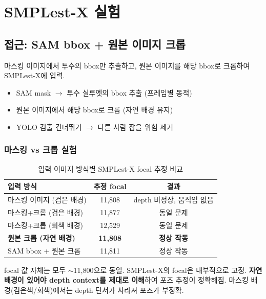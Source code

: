 \documentclass[11pt, a4paper]{report}
\begin{document}
\chapter{SMPLest-X 실험}

\section{접근: SAM bbox + 원본 이미지 크롭}

마스킹 이미지에서 투수의 bbox만 추출하고, 원본 이미지를 해당 bbox로 크롭하여 SMPLest-X에 입력.

\begin{itemize}[leftmargin=*]
  \item SAM mask $\rightarrow$ 투수 실루엣의 bbox 추출 (프레임별 동적)
  \item 원본 이미지에서 해당 bbox로 크롭 (자연 배경 유지)
  \item YOLO 검출 건너뛰기 $\rightarrow$ 다른 사람 잡을 위험 제거
\end{itemize}

\subsection{마스킹 vs 크롭 실험}

\begin{table}[H]
\centering
\caption{입력 이미지 방식별 SMPLest-X focal 추정 비교}
\renewcommand{\arraystretch}{1.3}
\begin{tabular}{l c c}
\toprule
\textbf{입력 방식} & \textbf{추정 focal} & \textbf{결과} \\
\midrule
마스킹 이미지 (검은 배경) & 11,808 & depth 비정상, 움직임 없음 \\
마스킹+크롭 (검은 배경) & 11,877 & 동일 문제 \\
마스킹+크롭 (회색 배경) & 12,529 & 동일 문제 \\
\textbf{원본 크롭 (자연 배경)} & \textbf{11,808} & \textbf{정상 작동} \\
SAM bbox + 원본 크롭 & 11,811 & 정상 작동 \\
\bottomrule
\end{tabular}
\end{table}

\begin{keyidea}
focal 값 자체는 모두 $\sim$11,800으로 동일. SMPLest-X의 focal은 내부적으로 고정.
\textbf{자연 배경이 있어야 depth context를 제대로 이해}하여 포즈 추정이 정확해짐.
마스킹 배경(검은색/회색)에서는 depth 단서가 사라져 포즈가 부정확.
\end{keyidea}
\end{document}
